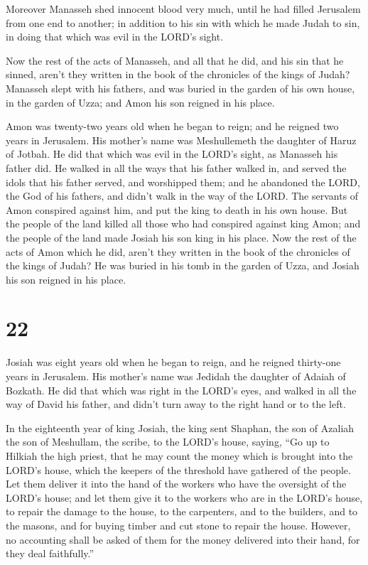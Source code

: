  Moreover Manasseh shed innocent blood very much, until
he had filled Jerusalem from one end to another; in addition to his sin
with which he made Judah to sin, in doing that which was evil in the
LORD's sight.

 Now the rest of the acts of Manasseh, and all that he
did, and his sin that he sinned, aren't they written in the book of the
chronicles of the kings of Judah?  Manasseh slept with
his fathers, and was buried in the garden of his own house, in the
garden of Uzza; and Amon his son reigned in his place.

 Amon was twenty-two years old when he began to reign;
and he reigned two years in Jerusalem. His mother's name was
Meshullemeth the daughter of Haruz of Jotbah.  He did
that which was evil in the LORD's sight, as Manasseh his father did.
 He walked in all the ways that his father walked in, and
served the idols that his father served, and worshipped them;
 and he abandoned the LORD, the God of his fathers, and
didn't walk in the way of the LORD.  The servants of Amon
conspired against him, and put the king to death in his own house.
 But the people of the land killed all those who had
conspired against king Amon; and the people of the land made Josiah his
son king in his place.  Now the rest of the acts of Amon
which he did, aren't they written in the book of the chronicles of the
kings of Judah?  He was buried in his tomb in the garden
of Uzza, and Josiah his son reigned in his place.

\hypertarget{section-21}{%
\section{22}\label{section-21}}

 Josiah was eight years old when he began to reign, and he
reigned thirty-one years in Jerusalem. His mother's name was Jedidah the
daughter of Adaiah of Bozkath.  He did that which was
right in the LORD's eyes, and walked in all the way of David his father,
and didn't turn away to the right hand or to the left.

 In the eighteenth year of king Josiah, the king sent
Shaphan, the son of Azaliah the son of Meshullam, the scribe, to the
LORD's house, saying,  ``Go up to Hilkiah the high priest,
that he may count the money which is brought into the LORD's house,
which the keepers of the threshold have gathered of the people.
 Let them deliver it into the hand of the workers who have
the oversight of the LORD's house; and let them give it to the workers
who are in the LORD's house, to repair the damage to the house,
 to the carpenters, and to the builders, and to the
masons, and for buying timber and cut stone to repair the house.
 However, no accounting shall be asked of them for the
money delivered into their hand, for they deal faithfully.''

